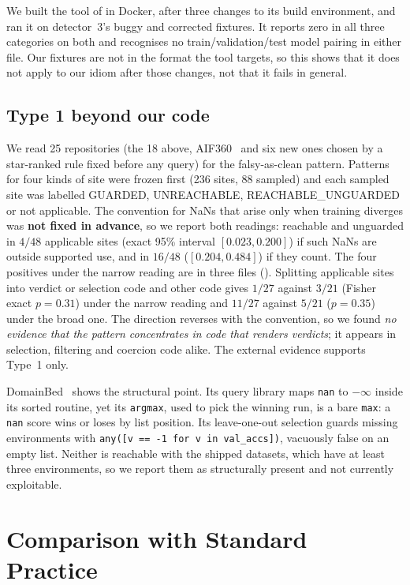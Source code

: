 \documentclass[pmlr,twocolumn,10pt]{jmlr}
\begin{document}
We built the tool of \citet{yang2022leakage} in Docker, after three changes to
its build environment, and ran it on detector~3's buggy and corrected fixtures.
It reports zero in all three categories on both and recognises no
train/validation/test model pairing in either file. Our fixtures are not in the
format the tool targets, so this shows that it does not apply to our idiom after
those changes, not that it fails in general.

\subsection{Type 1 beyond our code}

We read 25 repositories (the 18 above, AIF360~\citep{bellamy2019aif360} and six
new ones chosen by a star-ranked rule fixed before any query) for the
falsy-as-clean pattern. Patterns for four kinds of site were frozen first (236
sites, 88 sampled) and each sampled site was labelled GUARDED, UNREACHABLE,
REACHABLE\_UNGUARDED or not applicable. The convention for NaNs that arise only
when training diverges was \textbf{not fixed in advance}, so we report both
readings: reachable and unguarded in $4/48$ applicable sites (exact 95\%
interval $[0.023, 0.200]$) if such NaNs are outside supported use, and in
$16/48$ ($[0.204, 0.484]$) if they count. The four positives under the narrow
reading are in three files (). Splitting applicable
sites into verdict or selection code and other code gives $1/27$ against $3/21$
(Fisher exact $p=0.31$) under the narrow reading and $11/27$ against $5/21$
($p=0.35$) under the broad one. The direction reverses with the convention, so
we found \emph{no evidence that the pattern concentrates in code that renders
verdicts}; it appears in selection, filtering and coercion code alike. The
external evidence supports Type~1 only.

DomainBed~\citep{gulrajani2021search} shows the structural point. Its query
library maps \texttt{nan} to $-\infty$ inside its sorted routine, yet its
\texttt{argmax}, used to pick the winning run, is a bare \texttt{max}: a
\texttt{nan} score wins or loses by list position. Its leave-one-out selection
guards missing environments with \texttt{any([v == -1 for v in val\_accs])},
vacuously false on an empty list. Neither is reachable with the shipped datasets,
which have at least three environments, so we report them as structurally
present and not currently exploitable.

\section{Comparison with Standard Practice}
\label{sec:baselines}
\end{document}
